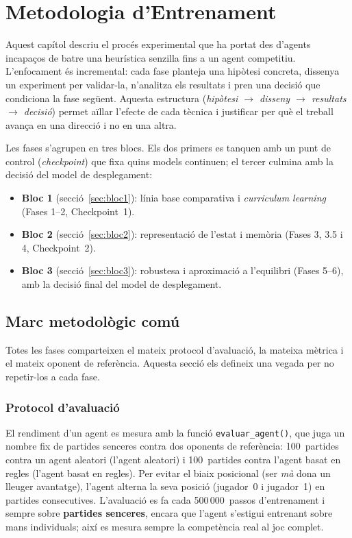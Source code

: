 ﻿%

\chapter{Metodologia d'Entrenament}
\label{cap:metodologia}

Aquest capítol descriu el procés experimental que ha portat des d'agents incapaços de
batre una heurística senzilla fins a un agent competitiu. L'enfocament és incremental:
cada fase planteja una hipòtesi concreta, dissenya un experiment per validar-la,
n'analitza els resultats i pren una decisió que condiciona la fase següent. Aquesta
estructura (\emph{hipòtesi $\rightarrow$ disseny $\rightarrow$ resultats $\rightarrow$
decisió}) permet aïllar l'efecte de cada tècnica i justificar per què el treball avança
en una direcció i no en una altra.

Les fases s'agrupen en tres blocs. Els dos primers es tanquen amb un punt de control
(\emph{checkpoint}) que fixa quins models continuen; el tercer culmina amb la decisió
del model de desplegament:

\begin{itemize}
  \item \textbf{Bloc 1} (secció~\ref{sec:bloc1}): línia base comparativa i
        \emph{curriculum learning} (Fases 1--2, Checkpoint~1).
  \item \textbf{Bloc 2} (secció~\ref{sec:bloc2}): representació de l'estat i memòria
        (Fases 3, 3.5 i 4, Checkpoint~2).
  \item \textbf{Bloc 3} (secció~\ref{sec:bloc3}): robustesa i aproximació a l'equilibri
        (Fases 5--6), amb la decisió final del model de desplegament.
\end{itemize}

\section{Marc metodològic comú}
\label{sec:marc-metodologic}

Totes les fases comparteixen el mateix protocol d'avaluació, la mateixa mètrica i el
mateix oponent de referència. Aquesta secció els defineix una vegada per no repetir-los
a cada fase.

\subsection*{Protocol d'avaluació}

El rendiment d'un agent es mesura amb la funció \texttt{evaluar\_agent()}, que juga un
nombre fix de partides senceres contra dos oponents de referència: 100~partides contra
un agent aleatori (l'agent aleatori) i 100~partides contra l'agent basat en regles
(l'agent basat en regles). Per evitar el biaix posicional (ser \emph{mà} dona un lleuger
avantatge), l'agent alterna la seva posició (jugador~0 i jugador~1) en partides
consecutives. L'avaluació es fa cada 500\,000~passos d'entrenament i sempre sobre
\textbf{partides senceres}, encara que l'agent s'estigui entrenant sobre mans
individuals; així es mesura sempre la competència real al joc complet.

